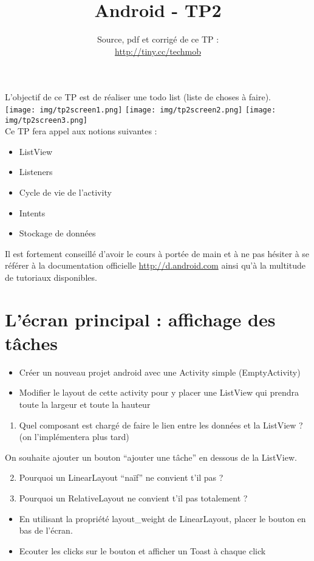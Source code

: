 \documentclass{article}
\title{Android - TP2}
\date{Source, pdf et corrigé de ce TP
:\\ \href{http://tiny.cc/techmob}{http://tiny.cc/techmob}}
\begin{document}
\maketitle
L'objectif de ce TP est de réaliser une todo list (liste de choses à faire).\\
\texttt{[image: img/tp2screen1.png]}
\texttt{[image: img/tp2screen2.png]}
\texttt{[image: img/tp2screen3.png]}\\
Ce TP fera appel aux notions suivantes :
\begin{itemize}
  \item ListView
  \item Listeners
  \item Cycle de vie de l'activity
  \item Intents
  \item Stockage de données
\end{itemize}
Il est fortement conseillé d'avoir le cours à portée de main et à ne pas hésiter
à se référer à la documentation officielle
\href{http://d.android.com}{http://d.android.com} ainsi qu'à la multitude de
tutoriaux disponibles.
\section{L'écran principal : affichage des tâches}
\begin{itemize}
  \item Créer un nouveau projet android avec une Activity simple (EmptyActivity)
  \item Modifier le layout de cette activity pour y placer une ListView qui
  prendra toute la largeur et toute la hauteur
\end{itemize}
\begin{enumerate}
 \setcounter{enumi}{0}
 \item Quel composant est chargé de faire le lien entre les données et la
 ListView ? (on l'implémentera plus tard)
 \end{enumerate}
 On souhaite ajouter un bouton ``ajouter une tâche'' en dessous de la ListView.
 \begin{enumerate}
 \setcounter{enumi}{1}
\item Pourquoi un LinearLayout ``naïf'' ne convient t'il pas ?
\item Pourquoi un RelativeLayout ne convient t'il pas totalement ?
\end{enumerate}
\begin{itemize}
  \item En utilisant la propriété layout\_weight de LinearLayout, placer le
  bouton en bas de l'écran.
  \item Ecouter les clicks sur le bouton et afficher un Toast à chaque click
\end{itemize}
\end{document}
